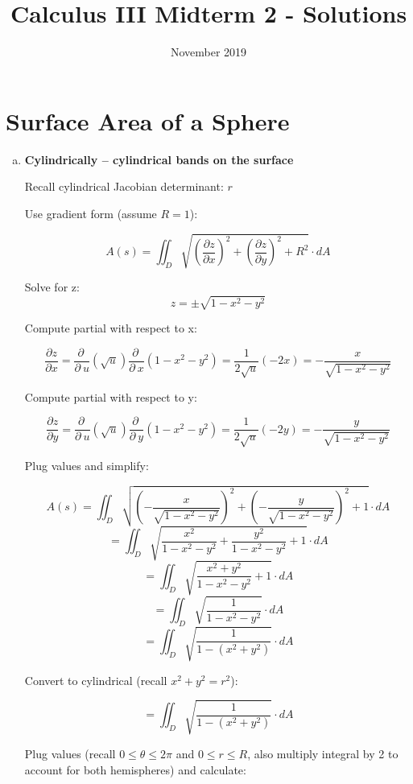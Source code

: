\documentclass{article}
\title{Calculus III Midterm 2 - Solutions}
\date{November 2019}
\begin{document}
\maketitle

\section{Surface Area of a Sphere}
\begin{enumerate}[a.]
	\item \textbf{Cylindrically -- cylindrical bands on the surface }

            Recall cylindrical Jacobian determinant: $ r $

            Use gradient form (assume $R = 1$):

            \[ A(s) = \iint_{D}\sqrt{ (\frac{\partial z}{\partial x})^2 + (\frac{\partial z}{\partial y})^2 + R^2 } \cdot dA \]

            Solve for z: \[ z = \pm\sqrt{1-x^{2}-y^{2}} \]

            Compute partial with respect to x:

            \[ \frac{\partial z}{\partial x} = \frac{\partial \:}{\partial \:u}\left(\sqrt{u}\right)\frac{\partial \:}{\partial \:x}\left(1-x^2-y^2\right) = \frac{1}{2\sqrt{u}}\left(-2x\right) = -\frac{x}{\sqrt{1-x^2-y^2}} \]

            Compute partial with respect to y:

            \[ \frac{\partial z}{\partial y} = \frac{\partial \:}{\partial \:u}\left(\sqrt{u}\right)\frac{\partial \:}{\partial \:y}\left(1-x^2-y^2\right) = \frac{1}{2\sqrt{u}}\left(-2y\right) = -\frac{y}{\sqrt{1-x^2-y^2}} \]

            Plug values and simplify:

            \[ A(s) = \iint_{D}\sqrt{\left(-\frac{x}{\sqrt{1-x^2-y^2}}\right)^2+\left(-\frac{y}{\sqrt{1-x^2-y^2}}\right)^2+1}  \cdot dA \]
            \[ = \iint_{D}\sqrt{\frac{x^2}{1-x^2-y^2}+\frac{y^2}{1-x^2-y^2}+1}  \cdot dA \]
            \[ = \iint_{D}\sqrt{\frac{x^2+y^2}{1-x^2-y^2}+1}  \cdot dA \]
            \[ = \iint_{D}\sqrt{\frac{1}{1-x^2-y^2}}  \cdot dA \]
            \[ = \iint_{D}\sqrt{\frac{1}{1-(x^2+y^2)}}  \cdot dA \]

            Convert to cylindrical (recall $x^2 + y^2 = r^2$):

            \[ = \iint_{D}\sqrt{\frac{1}{1-(x^2+y^2)}}  \cdot dA \]

            Plug values (recall $0 \leq \theta \leq 2\pi $ and $0 \leq r \leq R $, also multiply integral by 2 to account for both hemispheres) and calculate:


\end{enumerate}
\end{document}
